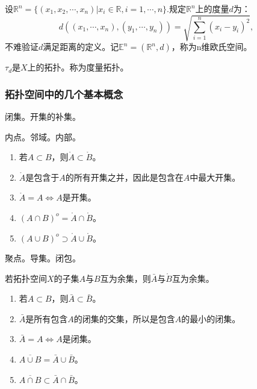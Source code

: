 \begin{example}
    设$\mathbb{R}^n=\{(x_1,x_2,\cdots,x_n)\big| x_i\in \mathbb{R},i=1,\cdots,n\}$.规定$\mathbb{R}^n$上的度量$d$为：
    \begin{equation*}
        d((x_1,\cdots,x_n),(y_1,\cdots,y_n))=\sqrt{\sum_{i=1}^{n}(x_i-y_i)^2},
    \end{equation*}
    不难验证$d$满足距离的定义。记$\mathbb{E}^{n}=(\mathbb{R}^{n},d)$，称为n维欧氏空间。
\end{example}

\begin{proposition}
    $\tau_d$是$X$上的拓扑。称为度量拓扑。
\end{proposition}

\subsubsection{拓扑空间中的几个基本概念}

\begin{definition}
    闭集。开集的补集。
\end{definition}

\begin{definition}
    内点。邻域。内部。
\end{definition}

\begin{proposition}
    \begin{enumerate}
        \item 若$A\subset B$，则$\mathring{A}\subset \mathring{B}$。
        \item $\mathring{A}$是包含于$A$的所有开集之并，因此是包含在$A$中最大开集。
        \item $\mathring{A}=A$$\Leftrightarrow$$A$是开集。
        \item $(A\cap B)^{o}=\mathring{A}\cap \mathring{B}$。
        \item $(A\cup B)^{o}\supset\mathring{A}\cup \mathring{B}$。
    \end{enumerate}
\end{proposition}

\begin{definition}
    聚点。导集。闭包。
\end{definition}

\begin{proposition}
    若拓扑空间$X$的子集$A$与$B$互为余集，则$\bar{A}$与$\mathring{B}$互为余集。
\end{proposition}

\begin{proposition}
    \begin{enumerate}
        \item 若$A\subset B$，则$\bar{A}\subset \bar{B}$。
        \item $\bar{A}$是所有包含$A$的闭集的交集，所以是包含$A$的最小的闭集。
        \item $\bar{A}=A$$\Leftrightarrow$$A$是闭集。
        \item $\overline{A\cup B}=\bar{A}\cup \bar{B}$。
        \item $\overline{A\cap B}\subset \bar{A}\cap \bar{B}$。
    \end{enumerate}
\end{proposition}


